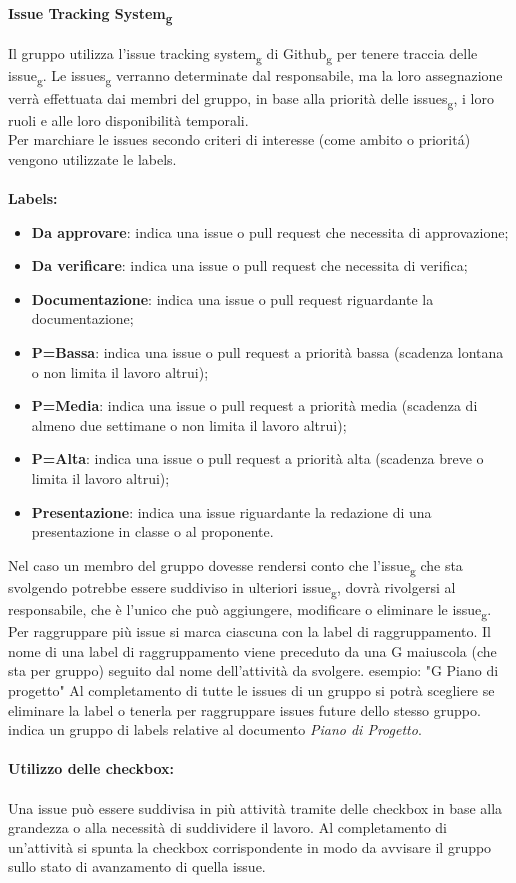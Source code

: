 \paragraph{Issue Tracking System\textsubscript{g}}
Il gruppo utilizza l'issue tracking system\textsubscript{g} di Github\textsubscript{g} per tenere traccia delle issue\textsubscript{g}. 
Le issues\textsubscript{g} verranno determinate dal responsabile, ma la loro assegnazione verrà effettuata dai membri del gruppo, in base alla priorità delle issues\textsubscript{g}, i loro ruoli e alle loro disponibilità temporali.\\
Per marchiare le issues secondo criteri di interesse (come ambito o prioritá) vengono utilizzate le labels.
\\\\\textbf{Labels:}
\begin{itemize}
	\item \textbf{Da approvare}: indica una issue o pull request che necessita di approvazione;
	\item \textbf{Da verificare}: indica una issue o pull request che necessita di verifica;
	\item \textbf{Documentazione}: indica una issue o pull request riguardante la documentazione;
	\item \textbf{P=Bassa}: indica una issue o pull request a priorità bassa (scadenza lontana o non limita il lavoro altrui);
	\item \textbf{P=Media}: indica una issue o pull request a priorità media (scadenza di almeno due settimane o non limita il lavoro altrui);
	\item \textbf{P=Alta}: indica una issue o pull request a priorità alta (scadenza breve o limita il lavoro altrui);
	\item \textbf{Presentazione}: indica una issue riguardante la redazione di una presentazione in classe o al proponente.
\end{itemize}

Nel caso un membro del gruppo dovesse rendersi conto che l'issue\textsubscript{g} che sta svolgendo potrebbe essere suddiviso in ulteriori issue\textsubscript{g}, dovrà rivolgersi al responsabile, che è l'unico che può aggiungere, modificare o eliminare le issue\textsubscript{g}.\\
Per raggruppare più issue si marca ciascuna con la label di raggruppamento.
Il nome di una label di raggruppamento viene preceduto da una G maiuscola (che sta per gruppo) seguito dal nome dell'attività da svolgere. esempio: "G Piano di progetto"
Al completamento di tutte le issues di un gruppo si potrà scegliere se eliminare la label o tenerla per raggruppare issues future dello stesso gruppo.
indica un gruppo di labels relative al documento \textit{Piano di Progetto}.
\\\\
\textbf{Utilizzo delle checkbox:}
\\\\
Una issue può essere suddivisa in più attività tramite delle checkbox in base alla grandezza o
alla necessità di suddividere il lavoro. Al completamento di un'attività si spunta la checkbox
corrispondente in modo da avvisare il gruppo sullo stato di avanzamento di quella issue.

